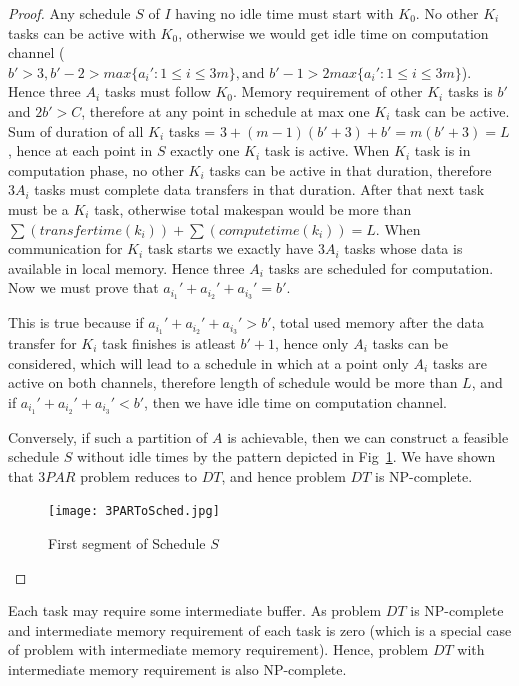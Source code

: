 \documentclass[runningheads]{llncs} %
\begin{document}
\begin{proof}
	Any schedule $S$ of $I$ having no idle time must start with $K_0$. No other $K_i$ tasks can be active with $K_0$, otherwise we would get idle time on computation channel ($b'>3, b'-2>max\{a_i':1\le i\le 3m\},  \text{and } b'-1 > 2 max\{a_i':1\le i\le 3m\}$). Hence three $A_i$ tasks must follow $K_0$.   	 
   	Memory requirement of other $K_i$ tasks is $b'$ and $2b'>C$, therefore at any point in schedule at max one $K_i$ task can be active. Sum of duration of all $K_i$ tasks = $3 + (m-1)(b'+3) + b' = m (b'+3)=L$, hence at each point in $S$ exactly one $K_i$ task is active. When $K_i$ task is in computation phase, no other $K_i$ tasks can be active in that duration, therefore  $3A_i$ tasks must complete data transfers in that duration. After that next task must be a 
   	$K_i$ task, otherwise total makespan would be more than $\sum(transfertime(k_i))  + 
   	\sum(computetime(k_i)) =L$. When communication for  $K_i$ task starts we exactly have $3A_i$ 
   	tasks whose data is available in local memory. Hence three $A_i$ tasks are scheduled for computation. Now we must prove that $a_{i_1}' + a_{i_2}'  + a_{i_3}'  = b'$.
   	
   	This is true because if $a_{i_1}' + a_{i_2}'  + a_{i_3}'  > b'$, total used memory after the data transfer 
   	for  $K_i$ task finishes is atleast $b'+1$, hence only $A_i$ tasks can be considered, which will lead to a schedule in which at a point only $A_i$ tasks are active on both channels, therefore length of 
   	schedule would be more than $L$, and if $a_{i_1}' + a_{i_2}'  + a_{i_3}'  < b'$, then we have idle time on computation channel.
   	
   	Conversely, if such a partition of $A$ is achievable, then we can construct a feasible schedule $S$ 
   	without idle times by the pattern depicted in Fig~\ref{fig:firstSegment}. We have shown that $3PAR$ 
   	problem reduces to $DT$, and hence problem $DT$ is NP-complete.
   	
   	
   	\begin{figure}[htb]
   		\centering
   		\texttt{[image: 3PARToSched.jpg]}
   		\caption{ \label{fig:firstSegment} First segment of Schedule $S$}
   	\end{figure}
   	
   \end{proof}

Each task may require some intermediate buffer. As problem $DT$ is NP-complete and intermediate 
memory requirement of each task is zero (which is a special case of problem with intermediate memory 
requirement). Hence, problem $DT$ with intermediate memory requirement is also NP-complete.
\end{document}
